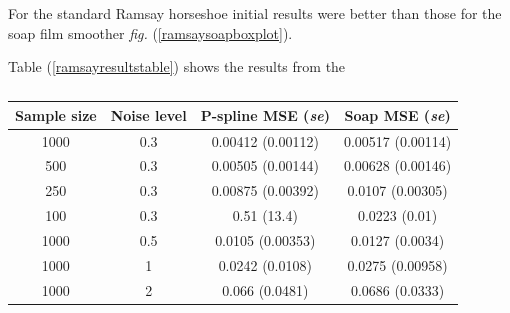 \documentclass[a4paper,10pt]{amsart}
\newcommand{\fig}[1]{\emph{fig.} (\ref{#1})}
\begin{document}
For the standard Ramsay horseshoe initial results were better than those for the soap film smoother \fig{ramsaysoapboxplot}.


Table (\ref{ramsayresultstable}) shows the results from the 


\begin{table}[ht]
\begin{tabular}{c c c c}\\
Sample size & Noise level & P-spline MSE (\emph{se}) & Soap MSE (\emph{se}) \\
\hline
\hline
1000 & 0.3 & 0.00412 (0.00112) & 0.00517 (0.00114) \\ 
500 & 0.3 & 0.00505 (0.00144) & 0.00628 (0.00146) \\ 
250 & 0.3 & 0.00875 (0.00392) & 0.0107 (0.00305) \\ 
100 & 0.3 & 0.51 (13.4) & 0.0223 (0.01) \\ 
1000 & 0.5 & 0.0105 (0.00353) & 0.0127 (0.0034) \\ 
1000 & 1 & 0.0242 (0.0108) & 0.0275 (0.00958) \\ 
1000 & 2 & 0.066 (0.0481) & 0.0686 (0.0333) \\ 
\end{tabular}
\label{ramsatresultstable}
\caption{}
\end{table}







\end{document}
